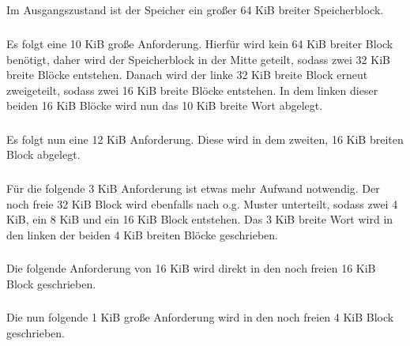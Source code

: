 \subsection{}
    Im Ausgangszustand ist der Speicher ein gro\ss{}er 64 KiB breiter Speicherblock.

    \subsubsection{}
        Es folgt eine 10 KiB gro\ss{}e Anforderung.
        Hierf\"{u}r wird kein 64 KiB breiter Block ben\"{o}tigt, daher wird der Speicherblock in der Mitte geteilt, sodass zwei 32 KiB breite Bl\"{o}cke entstehen.
        Danach wird der linke 32 KiB breite Block erneut zweigeteilt, sodass zwei 16 KiB breite Bl\"{o}cke entstehen.
        In dem linken dieser beiden 16 KiB Bl\"{o}cke wird nun das 10 KiB breite Wort abgelegt.

        

    \subsubsection{}
        Es folgt nun eine 12 KiB Anforderung.
        Diese wird in dem zweiten, 16 KiB breiten Block abgelegt.

        

    \subsubsection{}
        F\"{u}r die folgende 3 KiB Anforderung ist etwas mehr Aufwand notwendig.
        Der noch freie 32 KiB Block wird ebenfalls nach o.g. Muster unterteilt, sodass zwei 4 KiB, ein 8 KiB und ein 16 KiB Block entstehen.
        Das 3 KiB breite Wort wird in den linken der beiden 4 KiB breiten Bl\"{o}cke geschrieben.

        

    \subsubsection{}
        Die folgende Anforderung von 16 KiB wird direkt in den noch freien 16 KiB Block geschrieben.

        

    \subsubsection{}
        Die nun folgende 1 KiB gro\ss{}e Anforderung wird in den noch freien 4 KiB Block geschrieben.

